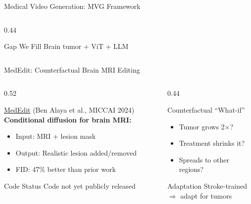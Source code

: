 \documentclass[aspectratio=169,xcolor=dvipsnames]{beamer}
\begin{document}
\begin{frame}{Medical Video Generation: MVG Framework}
\begin{columns}
\begin{column}{0.44\textwidth}
            \begin{alertblock}{Gap We Fill}
                \small Brain tumor + ViT + LLM
            \end{alertblock}
        \end{column}
    \end{columns}
\end{frame}

\begin{frame}{MedEdit: Counterfactual Brain MRI Editing}
    \begin{columns}
        \begin{column}{0.52\textwidth}
            \begin{block}{\href{https://arxiv.org/abs/2407.15270}{MedEdit} (Ben Alaya et al., MICCAI 2024)}
                \small
                \textbf{Conditional diffusion for brain MRI:}
                \begin{itemize}\setlength{\itemsep}{1pt}
                    \item Input: MRI + lesion mask
                    \item Output: Realistic lesion added/removed
                    \item FID: 47\% better than prior work
                \end{itemize}
            \end{block}
            
            \begin{alertblock}{ Code Status}
                \scriptsize Code not yet publicly released
            \end{alertblock}
        \end{column}
        
        \begin{column}{0.44\textwidth}
            \begin{block}{Counterfactual ``What-if''}
                \small
                \begin{itemize}\setlength{\itemsep}{1pt}
                    \item Tumor grows 2×?
                    \item Treatment shrinks it?
                    \item Spreads to other regions?
                \end{itemize}
            \end{block}
            
            \begin{alertblock}{Adaptation}
                \small Stroke-trained $\Rightarrow$ adapt for tumors
            \end{alertblock}
        \end{column}
    \end{columns}
\end{frame}
\end{document}

